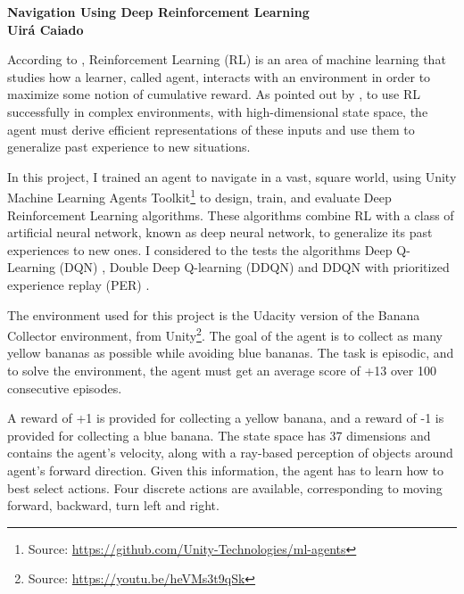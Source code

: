 \documentclass[a4paper]{article}
\begin{document}

\begin{center}

{\bf \large {Navigation Using Deep Reinforcement Learning \\ \small Uirá Caiado}}
\end{center}





According to \cite{spooner2016}, Reinforcement Learning (RL) is an area of machine learning that studies how a learner, called agent, interacts with an environment in order to maximize some notion of cumulative reward. As pointed out by \cite{mnih2015humanlevel}, to use RL successfully in complex environments, with high-dimensional state space, the agent must derive efficient representations of these inputs and use them to generalize past experience to new situations.

In this project, I trained an agent to navigate in a vast, square world, using Unity Machine Learning Agents Toolkit\footnote{Source: \url{https://github.com/Unity-Technologies/ml-agents}} to design, train, and evaluate Deep Reinforcement Learning algorithms. These algorithms combine RL with a class of artificial neural network, known as deep neural network, to generalize its past experiences to new ones. I considered to the tests the algorithms Deep Q-Learning (DQN) \cite{mnih2015humanlevel}, Double Deep Q-learning (DDQN) \cite{HasseltGS15} and DDQN with prioritized experience replay (PER) \cite{SchaulQAS15}.

The environment used for this project is the Udacity version of the Banana Collector environment, from Unity\footnote{Source: \url{https://youtu.be/heVMs3t9qSk}}. The goal of the agent is to collect as many yellow bananas as possible while avoiding blue bananas. The task is episodic, and to solve the environment, the agent must get an average score of +13 over 100 consecutive episodes.

A reward of +1 is provided for collecting a yellow banana, and a reward of -1 is provided for collecting a blue banana. The state space has 37 dimensions and contains the agent’s velocity, along with a ray-based perception of objects around agent’s forward direction. Given this information, the agent has to learn how to best select actions. Four discrete actions are available, corresponding to moving forward, backward, turn left and right.
\end{document}
